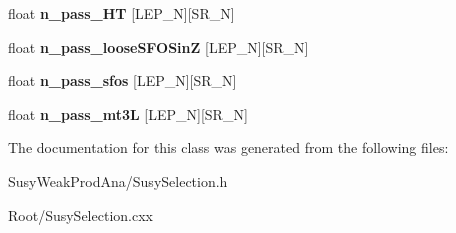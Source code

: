 \begin{DoxyCompactItemize}
\item 
\hypertarget{classSusySelection_a5c8b7f955f093909fd0eeda53dfec3ce}{
float {\bfseries n\_\-pass\_\-HT} \mbox{[}LEP\_\-N\mbox{]}\mbox{[}SR\_\-N\mbox{]}}
\label{classSusySelection_a5c8b7f955f093909fd0eeda53dfec3ce}

\item 
\hypertarget{classSusySelection_af950ca90654af399b78855dbaa94779a}{
float {\bfseries n\_\-pass\_\-looseSFOSinZ} \mbox{[}LEP\_\-N\mbox{]}\mbox{[}SR\_\-N\mbox{]}}
\label{classSusySelection_af950ca90654af399b78855dbaa94779a}

\item 
\hypertarget{classSusySelection_afd45758edcabb0987955eb0c48097436}{
float {\bfseries n\_\-pass\_\-sfos} \mbox{[}LEP\_\-N\mbox{]}\mbox{[}SR\_\-N\mbox{]}}
\label{classSusySelection_afd45758edcabb0987955eb0c48097436}

\item 
\hypertarget{classSusySelection_a40cdf57d6fbd17637b7f5042caad3651}{
float {\bfseries n\_\-pass\_\-mt3L} \mbox{[}LEP\_\-N\mbox{]}\mbox{[}SR\_\-N\mbox{]}}
\label{classSusySelection_a40cdf57d6fbd17637b7f5042caad3651}

\end{DoxyCompactItemize}


The documentation for this class was generated from the following files:\begin{DoxyCompactItemize}
\item 
SusyWeakProdAna/SusySelection.h\item 
Root/SusySelection.cxx\end{DoxyCompactItemize}
